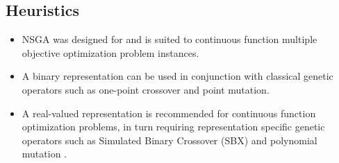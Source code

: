 \subsection{Heuristics}
\begin{itemize}
	\item NSGA was designed for and is suited to continuous function multiple objective optimization problem instances.
	\item A binary representation can be used in conjunction with classical genetic operators such as one-point crossover and point mutation.
	\item A real-valued representation is recommended for continuous function optimization problems, in turn requiring representation specific genetic operators such as Simulated Binary Crossover (SBX) and polynomial mutation \cite{Deb1995}.
\end{itemize}

